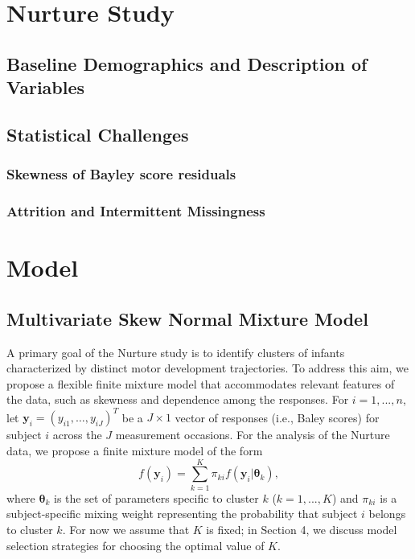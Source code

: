 \documentclass[useAMS,referee]{biom}
\begin{document}
\newpage

\section{Nurture Study}
\label{s:nurt}
\subsection{Baseline Demographics and Description of Variables}

\subsection{Statistical Challenges}
\subsubsection{Skewness of Bayley score residuals}
\subsubsection{Attrition and Intermittent Missingness}

\newpage

\section{Model}
\label{s:model}

\subsection{Multivariate Skew Normal Mixture Model}

A primary goal of the Nurture study is to identify clusters of infants characterized by distinct motor development trajectories. To address this aim, we propose a flexible finite mixture model that accommodates relevant features of the data, such as skewness and dependence among the responses. For $i = 1,...,n$, let $\mathbf{y}_{i}=(y_{i1},\ldots,y_{iJ})^T$ be a $J \times 1$ vector of responses (i.e., Baley scores) for subject $i$ across the $J$ measurement occasions. For the analysis of the Nurture data, we propose a finite mixture model of the form
\begin{equation}
f(\mathbf{y}_i) = \sum_{k = 1}^{K} \pi_{ki} f(\mathbf{y}_i|\boldsymbol\theta_k),
\end{equation}
where $\boldsymbol\theta_k$ is the set of parameters specific to cluster $k$ ($k = 1,...,K$) and $\pi_{ki}$ is a subject-specific mixing weight representing the probability that subject $i$ belongs to cluster $k$. For now we assume that $K$ is fixed; in Section 4, we discuss model selection strategies for choosing the optimal value of $K$. 
\end{document}
